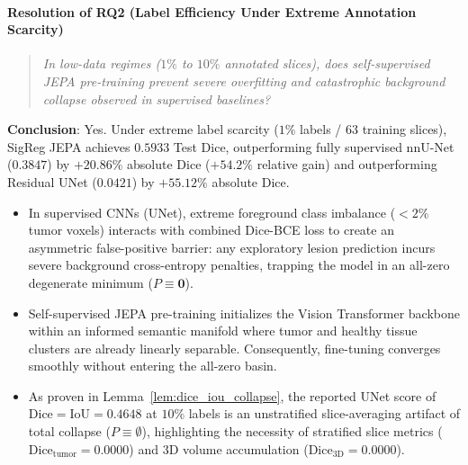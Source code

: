 \documentclass{article}
\begin{document}
\paragraph{Resolution of RQ2 (Label Efficiency Under Extreme Annotation Scarcity)}
\begin{quote}
\emph{In low-data regimes ($1\%$ to $10\%$ annotated slices), does self-supervised JEPA pre-training prevent severe overfitting and catastrophic background collapse observed in supervised baselines?}
\end{quote}
\textbf{Conclusion}: Yes. Under extreme label scarcity ($1\%$ labels / $63$ training slices), SigReg JEPA achieves $0.5933$ Test Dice, outperforming fully supervised nnU-Net ($0.3847$) by $+20.86\%$ absolute Dice ($+54.2\%$ relative gain) and outperforming Residual UNet ($0.0421$) by $+55.12\%$ absolute Dice. 
\begin{itemize}
    \item In supervised CNNs (UNet), extreme foreground class imbalance ($< 2\%$ tumor voxels) interacts with combined Dice-BCE loss to create an asymmetric false-positive barrier: any exploratory lesion prediction incurs severe background cross-entropy penalties, trapping the model in an all-zero degenerate minimum ($P \equiv \mathbf{0}$).
    \item Self-supervised JEPA pre-training initializes the Vision Transformer backbone within an informed semantic manifold where tumor and healthy tissue clusters are already linearly separable. Consequently, fine-tuning converges smoothly without entering the all-zero basin.
    \item As proven in Lemma~\ref{lem:dice_iou_collapse}, the reported UNet score of $\text{Dice} = \text{IoU} = 0.4648$ at $10\%$ labels is an unstratified slice-averaging artifact of total collapse ($P \equiv \emptyset$), highlighting the necessity of stratified slice metrics ($\text{Dice}_{\text{tumor}} = 0.0000$) and 3D volume accumulation ($\text{Dice}_{\text{3D}} = 0.0000$).
\end{itemize}
\end{document}
